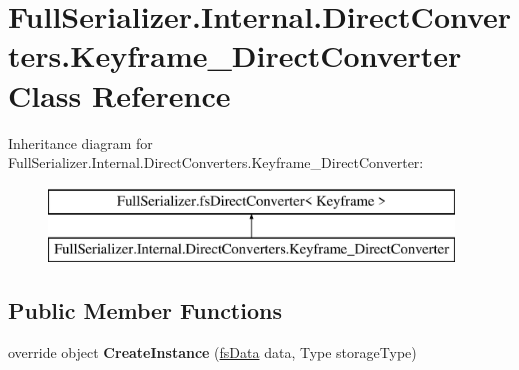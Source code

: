 \hypertarget{class_full_serializer_1_1_internal_1_1_direct_converters_1_1_keyframe___direct_converter}{}\section{Full\+Serializer.\+Internal.\+Direct\+Converters.\+Keyframe\+\_\+\+Direct\+Converter Class Reference}
\label{class_full_serializer_1_1_internal_1_1_direct_converters_1_1_keyframe___direct_converter}
Inheritance diagram for Full\+Serializer.\+Internal.\+Direct\+Converters.\+Keyframe\+\_\+\+Direct\+Converter\+:\begin{figure}[H]
\begin{center}
\leavevmode
\includegraphics[height=2.000000cm]{class_full_serializer_1_1_internal_1_1_direct_converters_1_1_keyframe___direct_converter}
\end{center}
\end{figure}
\subsection*{Public Member Functions}
\begin{DoxyCompactItemize}
\item 
\mbox{\label{class_full_serializer_1_1_internal_1_1_direct_converters_1_1_keyframe___direct_converter_aea3c4d54715cc2bc0d057c870916238b}} 
override object {\bfseries Create\+Instance} (\hyperlink{class_full_serializer_1_1fs_data}{fs\+Data} data, Type storage\+Type)
\end{DoxyCompactItemize}

